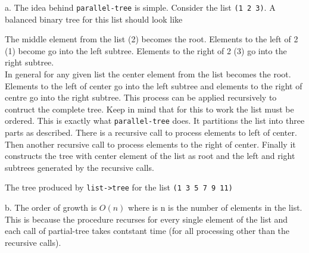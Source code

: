 \documentclass[a4paper,12pt]{article}
\begin{document}
a. The idea behind \texttt{parallel-tree} is simple. Consider the list \texttt{(1 2 3)}. A balanced binary tree for this list should look like
\begin{center}
\end{center}
The middle element from the list (2) becomes the root. Elements to the left of 2 (1) become go into the left subtree. Elements to the right of 2 (3) go into the right subtree. \\
In general for any given list the center element from the list becomes the root. Elements to the left of center go into the left subtree and elements to the right of centre go into the right subtree. This process can be applied recursively to contruct the complete tree. Keep in mind that for this to work the list must be ordered. This is exactly what \texttt{parallel-tree} does. It partitions the list into three parts as described. There is a recursive call to process elements to left of center. Then another recursive call to process elements to the right of center. Finally it constructs the tree with center element of the list as root and the left and right subtrees generated by the recursive calls.

\bigskip The tree produced by \texttt{list->tree} for the list \texttt{(1 3 5 7 9 11)}
\begin{center}
\end{center}

\bigskip b. The order of growth is $O(n)$ where is n is the number of elements in the list. This is because the procedure recurses for every single element of the list and each call of partial-tree takes contstant time (for all processing other than the recursive calls).
\end{document}
